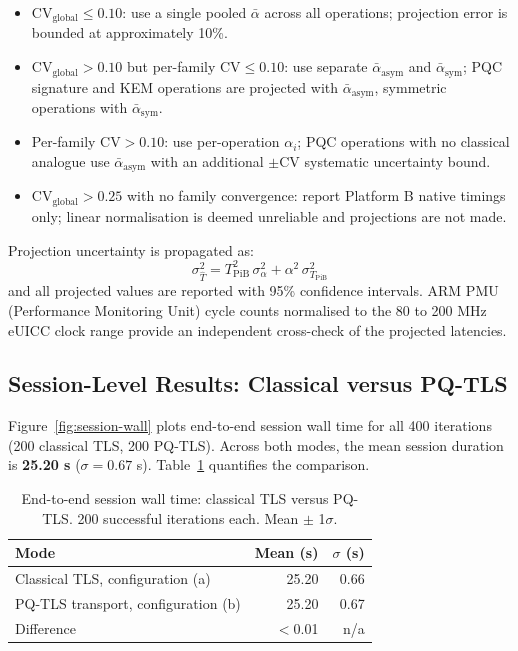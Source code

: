 \documentclass[a4paper,fleqn]{cas-sc}
\begin{document}
\begin{itemize}[leftmargin=*, noitemsep, topsep=4pt]
  \item $\text{CV}_{\text{global}} \leq 0.10$: use a single pooled
        $\bar{\alpha}$ across all operations; projection error
        is bounded at approximately 10\%.
  \item $\text{CV}_{\text{global}} > 0.10$ but per-family
        $\text{CV} \leq 0.10$: use separate $\bar{\alpha}_{\text{asym}}$
        and $\bar{\alpha}_{\text{sym}}$; PQC signature and KEM
        operations are projected with $\bar{\alpha}_{\text{asym}}$,
        symmetric operations with $\bar{\alpha}_{\text{sym}}$.
  \item Per-family $\text{CV} > 0.10$: use per-operation $\alpha_i$;
        PQC operations with no classical analogue use
        $\bar{\alpha}_{\text{asym}}$ with an additional
        $\pm\text{CV}$ systematic uncertainty bound.
  \item $\text{CV}_{\text{global}} > 0.25$ with no family convergence:
        report Platform B native timings only; linear normalisation is
        deemed unreliable and projections are not made.
\end{itemize}

Projection uncertainty is propagated as:
\begin{equation}
  \sigma_{\hat{T}}^{2} = T_{\text{PiB}}^{2}\,\sigma_{\alpha}^{2} +
  \alpha^{2}\,\sigma_{T_{\text{PiB}}}^{2}
\end{equation}
and all projected values are reported with 95\% confidence intervals.
ARM PMU (Performance Monitoring Unit) cycle counts normalised to the
80 to 200 MHz eUICC clock range provide an independent cross-check of the
projected latencies.

\subsection{Session-Level Results: Classical versus PQ-TLS}
\label{sec:bench-session}

Figure~\ref{fig:session-wall} plots end-to-end session wall time for
all 400 iterations (200 classical TLS, 200 PQ-TLS). Across both modes,
the mean session duration is \textbf{25.20 s} ($\sigma = 0.67$ s).
Table~\ref{tab:session-stats} quantifies the comparison.

\begin{table}[!htb]
\caption{End-to-end session wall time: classical TLS versus PQ-TLS.
  200 successful iterations each. Mean $\pm$ 1$\sigma$.}
\label{tab:session-stats}
\centering
\footnotesize
\setlength{\tabcolsep}{5pt}
\renewcommand{\arraystretch}{1.1}
\begin{tabular}{@{}lrr@{}}
\toprule
\textbf{Mode} & \textbf{Mean (s)} & \textbf{$\sigma$ (s)} \\
\midrule
Classical TLS, configuration (a) & 25.20 & 0.66 \\
PQ-TLS transport, configuration (b) & 25.20 & 0.67 \\
\midrule
Difference & $<$0.01 & n/a \\
\bottomrule
\end{tabular}
\end{table}
\end{document}

